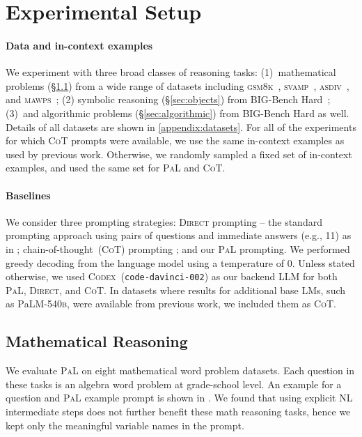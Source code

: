\documentclass[dvipsnames]{article} \usepackage[accepted]{icml2022}
\newcommand{\ours}{\textsc{PaL}\xspace}
\newcommand{\cotp}{\textsc{CoT}\xspace}
\newcommand{\direct}{\textsc{Direct}\xspace}
\newcommand{\llm}{LLM\xspace}
\newcommand{\gsm}{\textsc{gsm8k}\xspace}
\newcommand{\asdiv}{\textsc{asdiv}\xspace}
\newcommand{\svamp}{\textsc{svamp}\xspace}
\newcommand{\mawps}{\textsc{mawps}\xspace}
\newcommand{\largepalm}{\textsc{P}a\textsc{LM}\textsc{-540b}\xspace}
\newcommand{\codex}{\textsc{Codex}\xspace}
\begin{document}
\section{Experimental Setup}


\paragraph{Data and in-context examples} 
We experiment with three broad classes of reasoning tasks: (1)~mathematical problems  (\S\ref{sec:math}) from a wide range of datasets including \gsm~\citep{cobbe2021training}, \svamp~\citep{svamp}, \asdiv~\citep{asdiv}, and \mawps~\citep{mawps}; (2) symbolic reasoning (\S\ref{sec:objects}) from BIG-Bench Hard~\citep{Suzgun2022ChallengingBT}; (3)~and algorithmic problems  (\S\ref{sec:algorithmic}) from BIG-Bench Hard as well.  
Details of all datasets are shown in \autoref{appendix:datasets}. 
For all of the experiments for which \cotp prompts were available, we use the same in-context examples as used by previous work. Otherwise, we randomly sampled a fixed set of in-context examples, and used the same set for \ours and \cotp.



\paragraph{Baselines} We consider three prompting strategies: \direct prompting -- the standard prompting approach using pairs of questions and immediate answers (e.g., \colorbox{cotcolor}{11}) as in \citet{brown2020language}; chain-of-thought~(\cotp) prompting \citep{wei2022chain}; and our \ours prompting. We performed greedy decoding from the language model using a temperature of 0.
 Unless stated otherwise, we used \codex~(\texttt{code-davinci-002}) as our backend \llm for both \ours, \direct, and \cotp. In datasets where results for additional base LMs, such as \largepalm, were available from previous work, we included them as \cotp.




 \subsection{Mathematical Reasoning}
\label{sec:math}

We evaluate \ours on eight mathematical word problem datasets.
Each question in these tasks is an algebra word problem 
at grade-school level. An example for a question and \ours example prompt is shown in . We found that using explicit NL intermediate steps does not further benefit these math reasoning tasks, hence we kept only the meaningful variable names in the prompt. 
\end{document}
